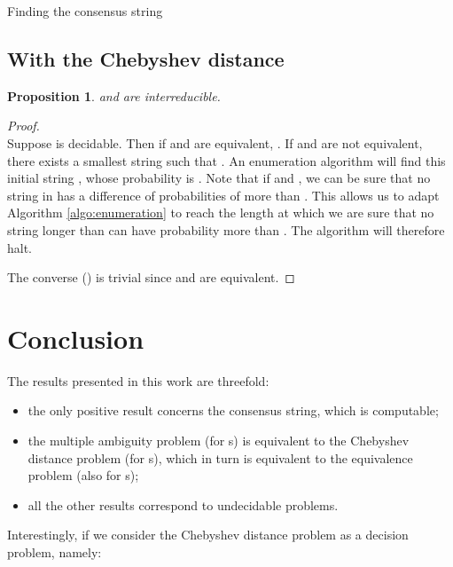 \documentclass[submission]{eptcs} \usepackage{breakurl}             \usepackage[english]{babel}
\newtheorem{proposition}{Proposition}
\begin{document}
\begin{algorithm}


\;
\;
\;
\;
\;
\While{}
{  \If{}
   {\;}
   \Else
   {\ForEach{  }
	{ \;
      \;
	  \If{}
	    {\;\;}
    }
    \;
   }	  
}
\Return 
\caption{Finding the consensus string}\label{algo:enumeration}
\end{algorithm}

\subsection{With the Chebyshev distance}
\begin{proposition}
 and  are interreducible.
\end{proposition}
\begin{proof}
\\
Suppose  is decidable. Then if  and  are equivalent, .
If  and  are not equivalent, there exists a smallest string  such that . An enumeration algorithm will find this initial string , whose probability is . Note that if  and , we can be sure that no string in  has a difference of probabilities of more than . This allows us to adapt Algorithm \ref{algo:enumeration} to reach the length  at which we are sure that no string  longer than  can have probability more than . The algorithm will therefore halt.

The converse () is trivial since   and  are equivalent.
\end{proof}



\section{Conclusion}\label{sec:con}
The results presented in this work are threefold:
\begin{itemize}
\item the only positive result concerns the consensus string, which is computable;
\item the multiple ambiguity problem (for s) is equivalent to the Chebyshev distance problem (for s), which in turn is equivalent to the equivalence problem (also for s);
\item all the other results correspond to undecidable problems.
\end{itemize}

Interestingly, if we consider the Chebyshev distance problem as a decision problem, namely:
\end{document}
